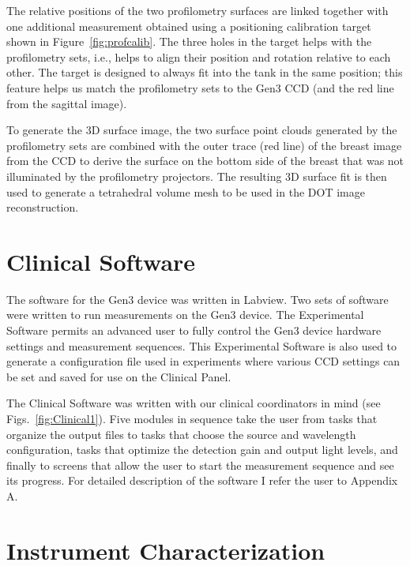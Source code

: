 The relative positions of the two profilometry surfaces are linked together with one additional measurement obtained using a positioning calibration target shown in Figure~\ref{fig:profcalib}. The three holes in the target helps with the profilometry sets, i.e., helps to align their position and rotation relative to each other. The target is designed to always fit into the tank in the same position; this feature helps us match the profilometry sets to the Gen3 CCD (and the red line from the sagittal image).

To generate the 3D surface image, the two surface point clouds generated by the profilometry sets are combined with the outer trace (red line) of the breast image from the CCD to derive the surface on the bottom side of the breast that was not illuminated by the profilometry projectors. The resulting 3D surface fit is then used to generate a tetrahedral volume mesh to be used in the DOT image reconstruction.
%
\section{Clinical Software}
\label{sec:clinicalui}
The software for the Gen3 device was written in Labview. Two sets of software were written to run measurements on the Gen3 device. The Experimental Software permits an advanced user to fully control the Gen3 device hardware settings and measurement sequences. This Experimental Software is also used to generate a configuration file used in experiments where various CCD settings can be set and saved for use on the Clinical Panel.

The Clinical Software was written with our clinical coordinators in mind (see Figs.~\ref{fig:Clinical1}). Five modules in sequence take the user from tasks that organize the output files to tasks that choose the source and wavelength configuration, tasks that optimize the detection gain and output light levels, and finally to screens that allow the user to start the measurement sequence and see its progress. For detailed description of the software I refer the user to Appendix A.

\section{Instrument Characterization}

